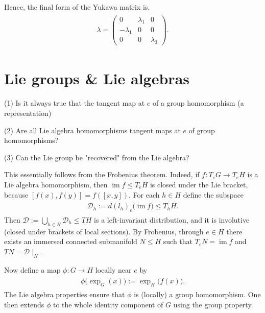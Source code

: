 \begin{mytheorem}
Hence, the final form of the Yukawa matrix is.
\begin{align}
\begin{aligned}
    \lambda=\begin{pmatrix}
        0 & \lambda_{1} & 0 \\
        -\lambda_{1} & 0 & 0 \\
        0 & 0 & \lambda_{3}
    \end{pmatrix} .
\end{aligned}
\end{align}
\end{mytheorem}





\section{Lie groups \& Lie algebras}



(1) Is it always true that the tangent map at $e$ of a group homomorphism (a representation)

(2) Are all Lie algebra homomorphisms tangent maps at $e$ of group homomorphisms?

(3) Can the Lie group be "recovered" from the Lie algebra?

This essentially follows from the Frobenius theorem.
Indeed, if $f \colon T_{e}G \to T_{e}H$ is a Lie algebra homomorphism, then $\operatorname{im} f \le T_{e}H$ is closed under the Lie bracket, because $[f(x),f(y)] = f([x,y])$.
For each $h \in H$ define the subspace
\begin{align}
\begin{aligned}
    \mathcal{D}_{h} := d(l_{h})_{e}\big(\operatorname{im} f\big) \le T_{h}H .
\end{aligned}
\end{align}
Then $\mathcal{D} := \bigcup_{h\in H} \mathcal{D}_{h} \le TH$ is a left-invariant distribution, and it is involutive (closed under brackets of local sections).
By Frobenius, through $e \in H$ there exists an immersed connected submanifold $N \le H$ such that $T_{e}N = \operatorname{im} f$ and $TN = \mathcal{D}\!\mid_{N}$.

Now define a map $\phi \colon G \to H$ locally near $e$ by
\begin{align}
\begin{aligned}
    \phi\big(\exp_{G}(x)\big) := \exp_{H}\big(f(x)\big) .
\end{aligned}
\end{align}
The Lie algebra properties ensure that $\phi$ is (locally) a group homomorphism.
One then extends $\phi$ to the whole identity component of $G$ using the group property.
